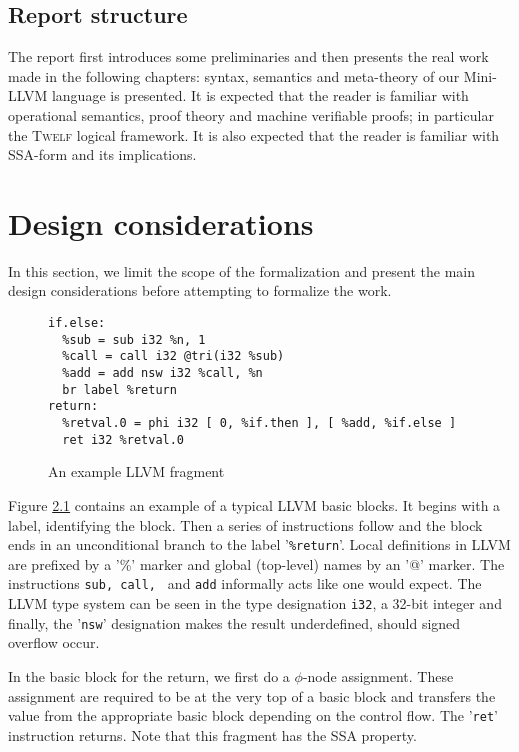 \documentclass[a4paper, oneside, 10pt, draft]{memoir}
\newcommand{\twelf}{\textsc{Twelf}}
\begin{document}
\section{Report structure}

The report first introduces some preliminaries and then presents the
real work made in the following chapters: syntax, semantics and
meta-theory of our Mini-LLVM language is presented. It is expected
that the reader is familiar with operational semantics, proof theory
and machine verifiable proofs; in particular the \twelf{} logical
framework. It is also expected that the reader is familiar with
SSA-form and its implications.

\chapter{Design considerations}

In this section, we limit the scope of the formalization and present
the main design considerations before attempting to formalize the work.

\begin{figure}
\begin{verbatim}
if.else:
  %sub = sub i32 %n, 1
  %call = call i32 @tri(i32 %sub)
  %add = add nsw i32 %call, %n
  br label %return
return:
  %retval.0 = phi i32 [ 0, %if.then ], [ %add, %if.else ]
  ret i32 %retval.0

\end{verbatim}
  \caption{An example LLVM fragment}
  \label{fig:llvm-example-1}
\end{figure}

Figure \ref{fig:llvm-example-1} contains an example of a typical LLVM
basic blocks. It begins with a label, identifying the block. Then a
series of instructions follow and the block ends in an unconditional
branch to the label '\texttt{\%return}'. Local definitions in LLVM are
prefixed by a '\%' marker and global (top-level) names by an '@'
marker. The instructions \texttt{sub, call, } and \texttt{add}
informally acts like one would expect. The LLVM type system can be
seen in the type designation \texttt{i32}, a 32-bit integer and
finally, the '\texttt{nsw}' designation makes the result underdefined,
should signed overflow occur.

In the basic block for the return, we first do a $\phi$-node
assignment. These assignment are required to be at the very top of a
basic block and transfers the value from the appropriate basic block
depending on the control flow. The '\texttt{ret}' instruction
returns. Note that this fragment has the SSA property.
\end{document}
